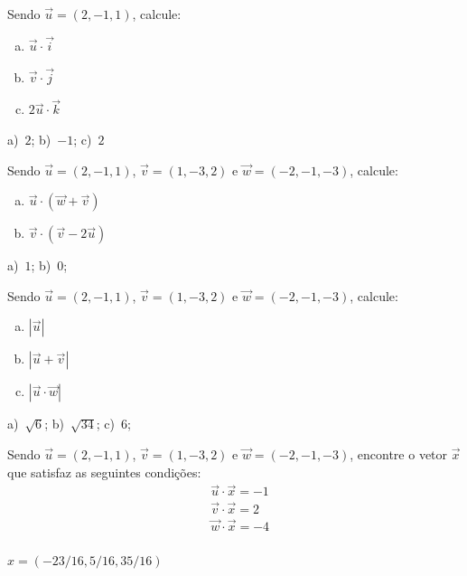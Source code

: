 \begin{exer}
  Sendo $\vec{u}=(2,-1,1)$, calcule:
  \begin{enumerate}[a)]
  \item $\vec{u}\cdot\vec{i}$
  \item $\vec{v}\cdot\vec{j}$
  \item $2\vec{u}\cdot\vec{k}$
  \end{enumerate}
\end{exer}
\begin{resp}
  a)~$2$; b)~$-1$; c)~$2$
\end{resp}

\begin{exer}
  Sendo $\vec{u}=(2,-1,1)$, $\vec{v}=(1,-3,2)$ e $\vec{w}=(-2,-1,-3)$, calcule:
  \begin{enumerate}[a)]
  \item $\vec{u}\cdot(\vec{w}+\vec{v})$
  \item $\vec{v}\cdot(\vec{v}-2\vec{u})$
  \end{enumerate}
\end{exer}
\begin{resp}
  a)~$1$; b)~$0$;
\end{resp}

\begin{exer}
  Sendo $\vec{u}=(2,-1,1)$, $\vec{v}=(1,-3,2)$ e $\vec{w}=(-2,-1,-3)$, calcule:
  \begin{enumerate}[a)]
  \item $|\vec{u}|$
  \item $|\vec{u}+\vec{v}|$
  \item $|\vec{u}\cdot\vec{w}|$
  \end{enumerate}
\end{exer}
\begin{resp}
  a)~$\sqrt{6}$; b)~$\sqrt{34}$; c)~$6$;
\end{resp}

\begin{exer}
  Sendo $\vec{u}=(2,-1,1)$, $\vec{v}=(1,-3,2)$ e $\vec{w}=(-2,-1,-3)$, encontre o vetor $\vec{x}$ que satisfaz as seguintes condições:
  \begin{align}
    &\vec{u}\cdot\vec{x} = -1\\
    &\vec{v}\cdot\vec{x} = 2\\
    &\vec{w}\cdot\vec{x} = -4\\
  \end{align}
\end{exer}
\begin{resp}
  $x = (-23/16, 5/16, 35/16)$
\end{resp}

